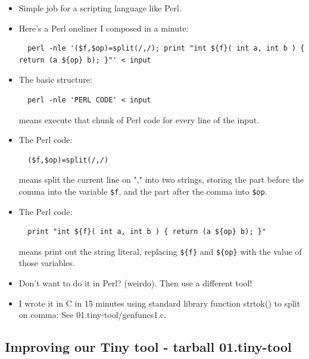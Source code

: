 \documentclass[handout,]{beamer}
\newcommand{\pitem}{\pause \item}
\begin{document}
\begin{frame}[fragile]
    \begin{itemize}
    \item
      Simple job for a scripting language like \alert{Perl}.

    \pitem
      Here's a Perl oneliner I composed in a minute:

\tiny
\begin{verbatim}
  perl -nle '($f,$op)=split(/,/); print "int ${f}( int a, int b ) { return (a ${op} b); }"' < input
\end{verbatim}
\small

    \pitem
      The basic structure:
\tiny
\begin{verbatim}
  perl -nle 'PERL CODE' < input
\end{verbatim}
\small

     means execute that chunk of Perl code for every line of the input.

      \pitem
      The Perl code:
\tiny
\begin{verbatim}
  ($f,$op)=split(/,/)
\end{verbatim}
\small

     means split the current line on "," into two strings,
     storing the part before the comma into the variable \verb+$f+,
     and the part after the comma into \verb+$op+.

      \pitem
      The Perl code:
\tiny
\begin{verbatim}
  print "int ${f}( int a, int b ) { return (a ${op} b); }"
\end{verbatim}
\small
      means print out the string literal, replacing \verb+${f}+ and \verb+${op}+ with the value of those variables.



    \pitem
      Don't want to do it in Perl?   (weirdo).
      \pause
      Then use a different tool!

    \pitem
    I wrote it in C in 15 minutes using standard library function
    \alert{strtok()} to split on comma:
    See \alert{01.tiny-tool/genfuncs1.c}.

    \end{itemize}
\end{frame}

\subsection{Improving our Tiny tool - tarball 01.tiny-tool}
\end{document}
